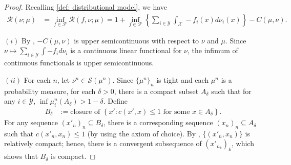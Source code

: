 \documentclass{amsart}
\theoremstyle{plain}
\numberwithin{equation}{section}\newtheorem{theorem}{Theorem}[section]
\theoremstyle{remark}
\begin{document}
\begin{proof}
Recalling \eqref{def: distributional model}, we have 
\begin{align*}
    \mathscr{R}(\nu; \mu) &= \inf_{f \in \mathcal{F}} \mathscr{R}(f,\nu; \mu)= 1 +\inf_{f \in \mathcal{F}} \left\{ \sum_{i \in \mathcal{Y}} \int_\mathcal{X} -f_i(x)d\nu_i(x) \right\} - C(\mu, \nu).
\end{align*}


$(i)$ By \cite[Lemma 4.3]{Oldandnew}, $-C(\mu, \nu)$ is upper semicontinuous with respect to $\nu$ and $\mu$. Since $\nu \mapsto \sum_{i \in \mathcal{Y}} \int -f_i d\nu_i$ is a continuous linear functional for $\nu$, the infimum of continuous functionals is upper semicontinuous.









$(ii)$ For each $n$, let $ \nu^n \in \mathcal{S}(\mu^n)$. Since $\{\mu^n\}_n$ is tight and each $\mu^n$ is a probability measure, for each $\delta > 0$, there is a compact subset $A_{\delta}$ such that for any $i \in \mathcal{Y}$, $\inf \mu_i^n(A_{\delta}) > 1 - \delta$. Define
\begin{align*}
    B_\delta&:= \text{closure of }\left\{x': c(x',x) \leq 1 \text{ for some $x \in A_\delta$} \right\}. 
\end{align*}
For any sequence $(x'_n)_n \subseteq B_\delta$, there is a corresponding sequence $(x_n)_n \subseteq A_\delta$ such that $c(x'_n, x_n) \leq 1$ (by using the axiom of choice). By , $\{(x'_n, x_n)\}$ is relatively compact; hence, there is a convergent subsequence of $(x'_{n_k})_k$, which shows that $B_\delta$ is compact.





\end{proof}
\end{document}
